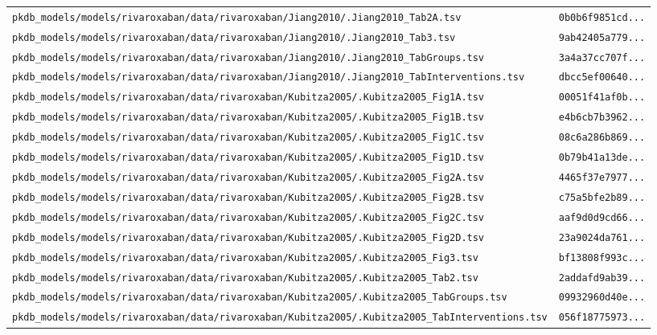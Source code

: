 \documentclass{article}
\begin{document}
\begin{longtable}{ll}
\texttt{pkdb\_models/models/rivaroxaban/data/rivaroxaban/Jiang2010/.Jiang2010\_Tab2A.tsv} & \texttt{0b0b6f9851cd...} \\
\texttt{pkdb\_models/models/rivaroxaban/data/rivaroxaban/Jiang2010/.Jiang2010\_Tab3.tsv} & \texttt{9ab42405a779...} \\
\texttt{pkdb\_models/models/rivaroxaban/data/rivaroxaban/Jiang2010/.Jiang2010\_TabGroups.tsv} & \texttt{3a4a37cc707f...} \\
\texttt{pkdb\_models/models/rivaroxaban/data/rivaroxaban/Jiang2010/.Jiang2010\_TabInterventions.tsv} & \texttt{dbcc5ef00640...} \\
\texttt{pkdb\_models/models/rivaroxaban/data/rivaroxaban/Kubitza2005/.Kubitza2005\_Fig1A.tsv} & \texttt{00051f41af0b...} \\
\texttt{pkdb\_models/models/rivaroxaban/data/rivaroxaban/Kubitza2005/.Kubitza2005\_Fig1B.tsv} & \texttt{e4b6cb7b3962...} \\
\texttt{pkdb\_models/models/rivaroxaban/data/rivaroxaban/Kubitza2005/.Kubitza2005\_Fig1C.tsv} & \texttt{08c6a286b869...} \\
\texttt{pkdb\_models/models/rivaroxaban/data/rivaroxaban/Kubitza2005/.Kubitza2005\_Fig1D.tsv} & \texttt{0b79b41a13de...} \\
\texttt{pkdb\_models/models/rivaroxaban/data/rivaroxaban/Kubitza2005/.Kubitza2005\_Fig2A.tsv} & \texttt{4465f37e7977...} \\
\texttt{pkdb\_models/models/rivaroxaban/data/rivaroxaban/Kubitza2005/.Kubitza2005\_Fig2B.tsv} & \texttt{c75a5bfe2b89...} \\
\texttt{pkdb\_models/models/rivaroxaban/data/rivaroxaban/Kubitza2005/.Kubitza2005\_Fig2C.tsv} & \texttt{aaf9d0d9cd66...} \\
\texttt{pkdb\_models/models/rivaroxaban/data/rivaroxaban/Kubitza2005/.Kubitza2005\_Fig2D.tsv} & \texttt{23a9024da761...} \\
\texttt{pkdb\_models/models/rivaroxaban/data/rivaroxaban/Kubitza2005/.Kubitza2005\_Fig3.tsv} & \texttt{bf13808f993c...} \\
\texttt{pkdb\_models/models/rivaroxaban/data/rivaroxaban/Kubitza2005/.Kubitza2005\_Tab2.tsv} & \texttt{2addafd9ab39...} \\
\texttt{pkdb\_models/models/rivaroxaban/data/rivaroxaban/Kubitza2005/.Kubitza2005\_TabGroups.tsv} & \texttt{09932960d40e...} \\
\texttt{pkdb\_models/models/rivaroxaban/data/rivaroxaban/Kubitza2005/.Kubitza2005\_TabInterventions.tsv} & \texttt{056f18775973...} \\

\end{longtable}
\end{document}
